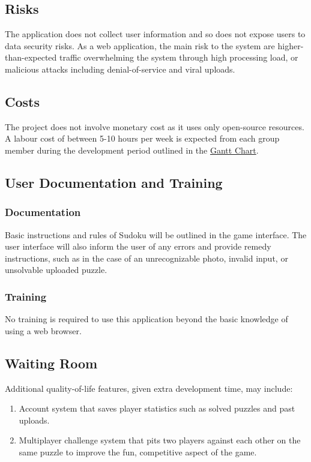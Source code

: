 \documentclass[11pt]{article}
\begin{document}
\subsection{Risks}
The application does not collect user information and so does not expose users to data security risks. As a web application, the main risk to the system are higher-than-expected traffic overwhelming the system through high processing load, or malicious attacks including denial-of-service and viral uploads.

\subsection{Costs}
The project does not involve monetary cost as it uses only open-source resources. A labour cost of between 5-10 hours per week is expected from each group member during the development period outlined in the \href{https://gitlab.cas.mcmaster.ca/bhuiyr2/sudokusolver_l02_grp08/-/blob/main/ProjectSchedule/Gantt_Sudoku.pdf}{Gantt Chart}.

\subsection{User Documentation and Training}
\subsubsection{Documentation}
Basic instructions and rules of Sudoku will be outlined in the game interface. The user interface will also inform the user of any errors and provide remedy instructions, such as in the case of an unrecognizable photo, invalid input, or unsolvable uploaded puzzle.

\subsubsection{Training}
No training is required to use this application beyond the basic knowledge of using a web browser.

\subsection{Waiting Room}
Additional quality-of-life features, given extra development time, may include:
\begin{enumerate}
    \item Account system that saves player statistics such as solved puzzles and past uploads.
    \item Multiplayer challenge system that pits two players against each other on the same puzzle to improve the fun, competitive aspect of the game.
\end{enumerate}
\end{document}
